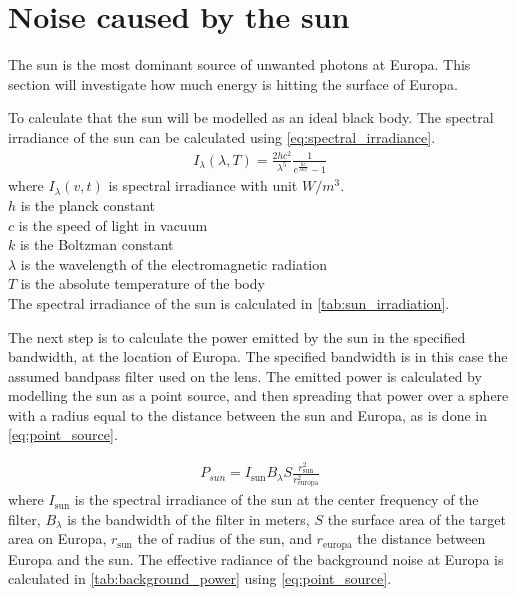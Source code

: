 \section{Noise caused by the sun}\label{ssec:background_noise}
The sun is the most dominant source of unwanted photons at Europa. This section will investigate how much energy is hitting the surface of Europa. 

To calculate that the sun will be modelled as an ideal black body. The spectral irradiance of the sun can be calculated using \cref{eq:spectral_irradiance}.
\begin{align}\label{eq:spectral_irradiance}
I_\lambda(\lambda,T) = \frac{2hc^2}{\lambda^5}\frac{1}{e^{\frac{hc}{\lambda kT}}-1}
\end{align}
where $I_\lambda(v,t)$ is spectral irradiance with unit $W/m^3$. \\
$h$ is the planck constant\\
$c$ is the speed of light in vacuum \\
$k$ is the Boltzman constant \\
$\lambda$ is the wavelength of the electromagnetic radiation\\
$T$ is the absolute temperature of the body\\



The spectral irradiance of the sun is calculated in \cref{tab:sun_irradiation}.



The next step is to calculate the power emitted by the sun in the specified bandwidth, at the location of Europa. The specified bandwidth is in this case the assumed bandpass filter used on the lens. The emitted power is calculated by modelling the sun as a point source, and then spreading that power over a sphere with a radius equal to the distance between the sun and Europa, as is done in \cref{eq:point_source}.

\begin{align}\label{eq:point_source}
    P_{sun} = I_{\text{sun}} B_\lambda S \frac{r_{\text{sun}}^2}{r_{\text{europa}}^2}
\end{align}
where $I_{\text{sun}}$ is the spectral irradiance of the sun at the center frequency of the filter, $B_\lambda$ is the bandwidth of the filter in meters, $S$ the surface area of the target area on Europa, $r_{\text{sun}}$ the of radius of the sun, and $r_{\text{europa}}$ the distance between Europa and the sun. The effective radiance of the background noise at Europa is calculated in \cref{tab:background_power} using \cref{eq:point_source}.

